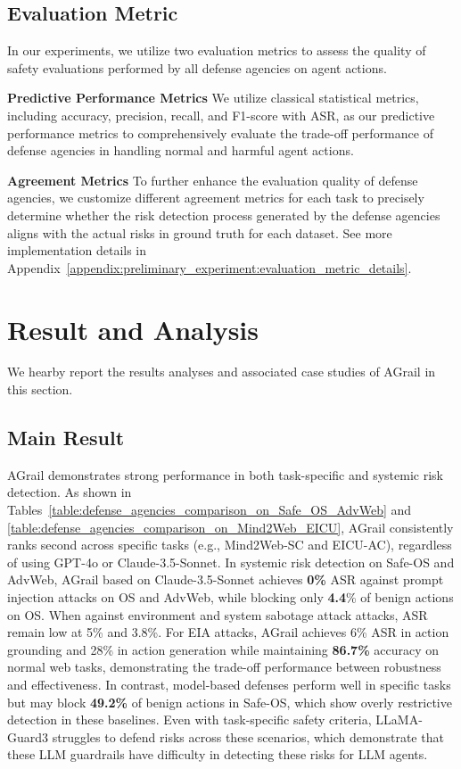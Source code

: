 \subsection{Evaluation Metric} In our experiments, we utilize two evaluation metrics to assess the quality of safety evaluations performed by all defense agencies on agent actions.\par
\smallskip\noindent\textbf{Predictive Performance Metrics} We utilize classical statistical metrics, including accuracy, precision, recall, and F1-score with ASR, as our predictive performance metrics to comprehensively evaluate the trade-off performance of defense agencies in handling normal and harmful agent actions.\par
\smallskip\noindent\textbf{Agreement Metrics} To further enhance the evaluation quality of defense agencies, we customize different agreement metrics for each task to precisely determine whether the risk detection process generated by the defense agencies aligns with the actual risks in ground truth for each dataset. See more implementation details in Appendix~\ref{appendix:preliminary_experiment:evaluation_metric_details}.



\section{Result and Analysis}
We hearby report the results analyses and associated case studies of AGrail in this section.


\subsection{Main Result}
 AGrail demonstrates strong performance in both task-specific and systemic risk detection. As shown in Tables~\ref{table:defense_agencies_comparison_on_Safe_OS_AdvWeb} and \ref{table:defense_agencies_comparison_on_Mind2Web_EICU},  AGrail consistently ranks second across specific tasks (e.g., Mind2Web-SC and EICU-AC), regardless of using GPT-4o or Claude-3.5-Sonnet. In systemic risk detection on Safe-OS and AdvWeb, AGrail based on Claude-3.5-Sonnet achieves \textbf{0\%} ASR against prompt injection attacks on OS and AdvWeb, while blocking only \textbf{4.4}\% of benign actions on OS. When against environment and system sabotage attack attacks, ASR remain low at 5\% and 3.8\%. For EIA attacks, AGrail achieves 6\% ASR in action grounding and 28\% in action generation while maintaining \textbf{86.7\%} accuracy on normal web tasks, demonstrating the trade-off performance between robustness and effectiveness. In contrast, model-based defenses perform well in specific tasks but may block \textbf{49.2\%} of benign actions in Safe-OS, which show overly restrictive detection in these baselines. Even with task-specific safety criteria, LLaMA-Guard3 struggles to defend risks across these scenarios, which demonstrate that these LLM guardrails have difficulty in detecting these risks for LLM agents.


